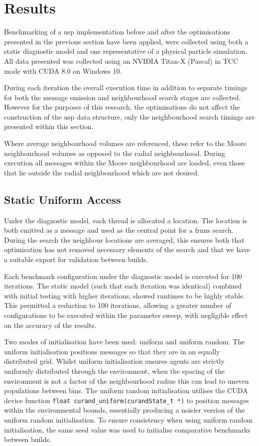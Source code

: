 \section{Results\label{sec:results}}
  
  Benchmarking of a \gls{usp} implementation before and after the optimisations presented in the previous section have been applied, were collected using both a static diagnostic model and one representative of a physical particle simulation. All data presented was collected using an NVIDIA Titan-X (Pascal) in TCC mode with CUDA 8.0 on Windows 10.
  
  During each iteration the overall execution time in addition to separate timings for both the message emission and neighbourhood search stages are collected. However for the purposes of this research, the optimisations do not affect the construction of the \gls{usp} data structure, only the neighbourhood search timings are presented within this section.
  
  Where average neighbourhood volumes are referenced, these refer to the Moore neighbourhood volumes as opposed to the radial neighbourhood. During execution all messages within the Moore neighbourhood are loaded, even those that lie outside the radial neighbourhood which are not desired.
  
  \subsection{Static Uniform Access}
    Under the diagnostic model, each thread is allocated a location. The location is both emitted as a message and used as the central point for a \gls{frnns} search. During the search the neighbour locations are averaged, this ensures both that optimisation has not removed necessary elements of the search and that we have a suitable export for validation between builds.
    
    Each benchmark configuration under the diagnostic model is executed for 100 iterations. The static model (such that each iteration was identical) combined with initial testing with higher iterations, showed runtimes to be highly stable. This permitted a reduction to 100 iterations, allowing a greater number of configurations to be executed within the parameter sweep, with negligible effect on the accuracy of the results.
  
    Two modes of initialisation have been used: uniform and uniform random. The uniform initialisation positions messages so that they are in an equally distributed grid. Whilst uniform initialisation ensures agents are strictly uniformly distributed through the environment, when the spacing of the environment is not a factor of the neighbourhood radius this can lead to uneven populations between bins. The uniform random initialisation utilises the CUDA device function \lstinline{float curand_uniform(curandState_t *)} to position messages within the environmental bounds, essentially producing a noisier version of the uniform random initialisation. To ensure consistency when using uniform random initialisation, the same seed value was used to initialise comparative benchmarks between builds.
    
